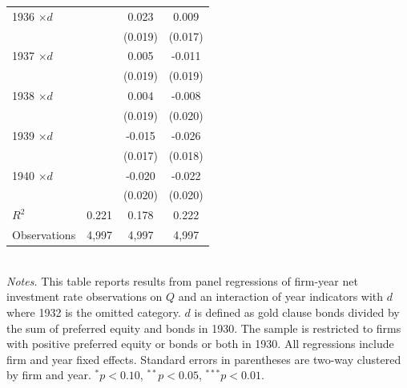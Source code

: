 \begin{table}[p]
\begin{tabular}{lccc}
1936 $\times d$  &                & 0.023          & 0.009          \\
                 &                & (0.019)        & (0.017)        \\
1937 $\times d$  &                & 0.005          & -0.011         \\
                 &                & (0.019)        & (0.019)        \\
1938 $\times d$  &                & 0.004          & -0.008         \\
                 &                & (0.019)        & (0.020)        \\
1939 $\times d$  &                & -0.015         & -0.026         \\
                 &                & (0.017)        & (0.018)        \\
1940 $\times d$  &                & -0.020         & -0.022         \\
                 &                & (0.020)        & (0.020)        \\
\midrule
$R^2$            & 0.221          & 0.178          & 0.222 \\
Observations     & 4{,}997        & 4{,}997        & 4{,}997 \\
\bottomrule
\end{tabular} \\

\vspace*{3mm} \justifying \noindent
\footnotesize{\textit{Notes.} This table reports results from panel regressions of firm-year net investment rate observations on $Q$ and an interaction of year indicators with $d$ where 1932 is the omitted category. $d$ is defined as gold clause bonds divided by the sum of preferred equity and bonds in 1930. The sample is restricted to firms with positive preferred equity or bonds or both in 1930. All regressions include firm and year fixed effects. Standard errors in parentheses are two-way clustered by firm and year. $^{*}p<0.10$, $^{**}p<0.05$, $^{***}p<0.01$.}
\end{table}









